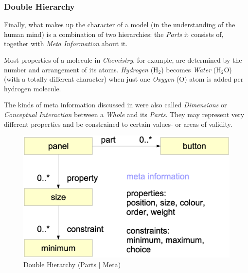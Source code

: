 %
%
%
%
%
%
%

\subsubsection{Double Hierarchy}
\label{double_hierarchy_heading}

Finally, what makes up the character of a model (in the understanding of the
human mind) is a combination of two hierarchies: the \emph{Parts} it consists
of, together with \emph{Meta Information} about it.

Most properties of a molecule in \emph{Chemistry}, for example, are determined
by the number and arrangement of its atoms. \emph{Hydrogen} (H$_{2}$) becomes
\emph{Water} (H$_{2}$O) (with a totally different character) when just one
\emph{Oxygen} (O) atom is added per hydrogen molecule.

The kinds of meta information discussed in \cite{heller2004} were also called
\emph{Dimensions} or \emph{Conceptual Interaction} between a \emph{Whole} and
its \emph{Parts}. They may represent very different properties and be
constrained to certain values- or areas of validity.

\begin{figure}[ht]
    \begin{center}
        \includegraphics[scale=0.2]{vector/double.eps}
        \caption{Double Hierarchy (Parts $\vert$ Meta)}
        \label{double_figure}
    \end{center}
\end{figure}


